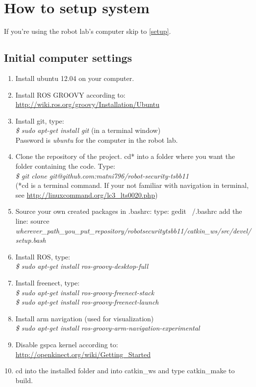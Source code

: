 \documentclass[10pt,a4paper]{article}
\begin{document}
\section{How to setup system}
If you're using the robot lab's computer skip to \ref{setup}.
\subsection{Initial computer settings}

\begin{enumerate}
\item Install ubuntu 12.04 on your computer.
\item Install ROS GROOVY according to: \url{http://wiki.ros.org/groovy/Installation/Ubuntu}
\item Install git, type:\\
\textit{
\$ sudo apt-get install git} (in a terminal window)\\
Password is \textit{ubuntu} for the computer in the robot lab.
\item Clone the repository of the project.
cd* into a folder where you want the folder containing the code.
Type:\\
\textit{\$ git clone git@github.com:matni796/robot-security-tsbb11}\\
(*cd is a terminal command. If your not familiar with navigation in terminal, see \url{http://linuxcommand.org/lc3\_lts0020.php})

\item Source your own created packages in .bashrc:
	type: gedit ~/.bashrc
add the line:
source \textit{wherever\_path\_you\_put\_repository/robot\-security\-tsbb11/catkin\_ws/src/devel/setup.bash}

\item Install ROS, type: \\
\textit{\$ sudo apt-get install ros-groovy-desktop-full}

\item Install freenect, type: \\
\textit{
\$ sudo apt-get install ros-groovy-freenect-stack\\
\$ sudo apt-get install ros-groovy-freenect-launch
}

\item Install arm navigation (used for visualization)\\
\textit{\$ sudo apt-get install ros-groovy-arm-navigation-experimental}

\item Disable gspca kernel according to:
	\url{http://openkinect.org/wiki/Getting\_Started}


\item cd into the installed folder and into catkin\_ws and type catkin\_make to build.
\end{enumerate}
\end{document}
